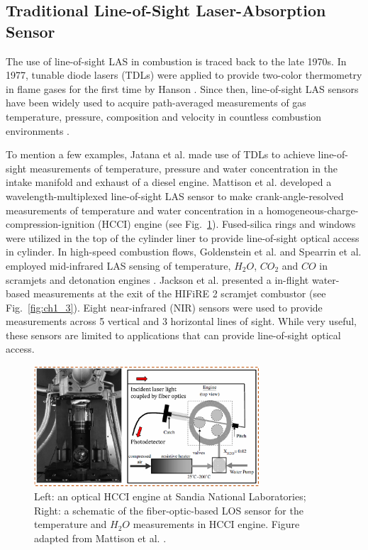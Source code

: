\subsection{Traditional Line-of-Sight Laser-Absorption Sensor}
The use of line-of-sight LAS in combustion is traced back to the late 1970s. In 1977, tunable diode lasers (TDLs) were applied to provide two-color thermometry in flame gases for the first time by Hanson \cite{Hanson19771479}. Since then, line-of-sight LAS sensors have been widely used to acquire path-averaged measurements of gas temperature, pressure, composition and velocity in countless combustion environments \cite{Goldenstein2017, HANSON20111, WOLFRUM19981,Allen1998, WERLE1998197, Lackner2007, Schulz2007, BOLSHOV201545, Eckbreth, Kohse, hanson2016spectroscopy}. 

To mention a few examples, Jatana et al. \cite{Jatana:15, Jatana2} made use of TDLs to achieve line-of-sight measurements of temperature, pressure and water concentration in the intake manifold and exhaust of a diesel engine. Mattison et al. \cite{Mattison2007} developed a wavelength-multiplexed line-of-sight LAS sensor to make crank-angle-resolved measurements of temperature and water concentration in a homogeneous-charge-compression-ignition (HCCI) engine (see Fig.\ \ref{fig:ch1_2}). Fused-silica rings and windows were utilized in the top of the cylinder liner to provide line-of-sight optical access in cylinder. In high-speed combustion flows, Goldenstein et al. \cite{goldenstein2014wavelength,goldenstein2014wavelength2} and Spearrin et al. \cite{spearrin1,spearrin2014quantum} employed mid-infrared LAS sensing of temperature, $H_2O$, $CO_2$ and $CO$ in scramjets and detonation engines \cite{goldenstein2015infrared}. Jackson et al. \cite{Jackson2015} presented a in-flight water-based measurements at the exit of the HIFiRE 2 scramjet combustor (see Fig.\ \ref{fig:ch1_3}). Eight near-infrared (NIR) sensors were used to provide measurements across 5 vertical and 3 horizontal lines of sight. While very useful, these sensors are limited to applications that can provide line-of-sight optical access.

\vspace{5mm}

\begin{figure}[ht]
    \centering
        \includegraphics[width=0.75\textwidth]{fig/ch1_fig5.png}
        \caption{Left: an optical HCCI engine at Sandia National Laboratories; Right: a schematic of the fiber-optic-based LOS sensor for the temperature and $H_2O$ measurements in HCCI engine. Figure adapted from Mattison et al. \cite{Mattison2007}.}
    \label{fig:ch1_2}
\end{figure}

